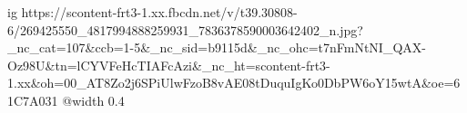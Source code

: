  
 
 
 
 

\ifcmt
  ig https://scontent-frt3-1.xx.fbcdn.net/v/t39.30808-6/269425550_4817994888259931_7836378590003642402_n.jpg?_nc_cat=107&ccb=1-5&_nc_sid=b9115d&_nc_ohc=t7nFmNtNI_QAX-Oz98U&tn=lCYVFeHcTIAFcAzi&_nc_ht=scontent-frt3-1.xx&oh=00_AT8Zo2j6SPiUlwFzoB8vAE08tDuquIgKo0DbPW6oY15wtA&oe=61C7A031
  @width 0.4
\fi
